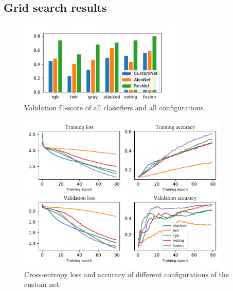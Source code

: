 \documentclass{l4proj}
\begin{document}
\begin{appendices}

\chapter{Grid search results}
\label{appendix_grid_search}

\begin{figure}[ht]
  \centering
  \includegraphics[width=0.7\textwidth]{images/evaluation/gridsearch/comparison}
  \caption{Validation f1-score of all classifiers and all configurations.}
  \label{fig:gridsearch_bar}
\end{figure}

\begin{figure}[ht]
  \centering
  \includegraphics[width=0.9\textwidth]{images/evaluation/gridsearch/CustomNet}
  \caption{Cross-entropy loss and accuracy of different configurations of the custom net.}
  \label{fig:customnet_configs}
\end{figure}


\end{appendices}
\end{document}
